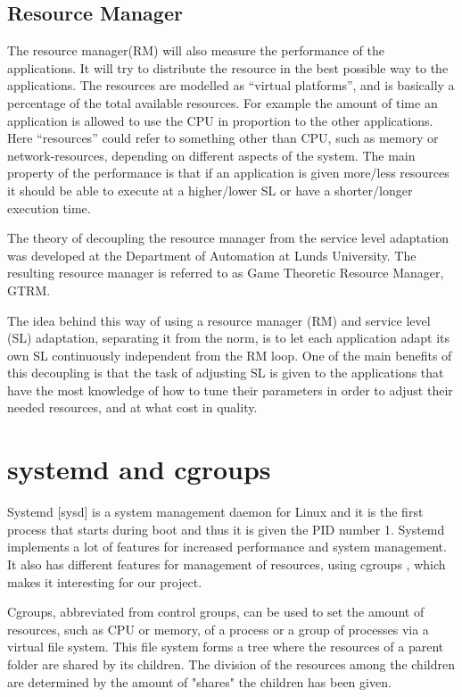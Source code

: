 \documentclass[nobiblatex]{LTHthesis}
\begin{document}
\subsection{Resource Manager}
The resource manager(RM) will also measure the performance of the applications. It will try to distribute the resource in the best possible way to the applications. The resources are modelled as “virtual platforms”, and is basically a percentage of the total available resources. For example the amount of time an application is allowed to use the CPU in proportion to the other applications. Here “resources” could refer to something other than CPU, such as memory or network-resources, depending on different aspects of the system. The main property of the performance is that if an application is given more/less resources it should be able to execute at a higher/lower SL or have a shorter/longer execution time.

The theory of decoupling the resource manager from the service level adaptation was developed at the Department of Automation at Lunds University. The resulting resource manager is referred to as Game Theoretic Resource Manager, GTRM. 

The idea behind this way of using a resource manager (RM) and service level (SL) adaptation, separating it from the norm, is to let each application adapt its own SL continuously independent from the RM loop. One of the main benefits of this decoupling is that the task of adjusting SL is given to the applications that have the most knowledge of how to tune their parameters in order to adjust their needed resources, and at what cost in quality.

\section{systemd and cgroups}
Systemd [sysd] is a system management daemon for Linux and it is the first process that starts during boot and thus it is given the PID number 1. Systemd implements a lot of features for increased performance and system management. It also has different features for management of resources, using cgroups \cite{cgroups}, which makes it interesting for our project. 

Cgroups, abbreviated from control groups, can be used to set the amount of resources, such as CPU or memory, of a process or a group of processes via a virtual file system. This file system forms a tree where the resources of a parent folder are shared by its children. The division of the resources among the children are determined by the amount of "shares" the children has been given. 
\end{document}
